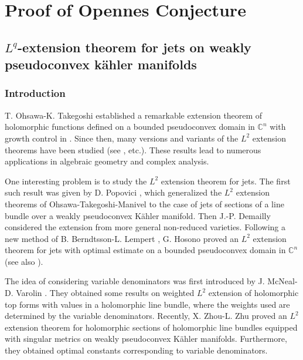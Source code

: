 \documentclass[lang=en,12pt,twoside]{textbook}
\begin{document}
\begin{titlepage}
    \tableofcontents
    \restoregeometry
\end{titlepage}


\part{Proof of Opennes Conjecture}


\chapter{\texorpdfstring{$L^q$}{L square}-extension theorem for jets on weakly pseudoconvex k\"ahler manifolds}

\section{Introduction}
T. Ohsawa-K. Takegoshi established a remarkable extension theorem of holomorphic functions defined on a bounded pseudoconvex domain in $\mathbb{C}^n$ with growth control in \cite{OhsawaTakegoshi1987}. Since then, many versions and variants of the $L^2$ extension theorems have been studied (see  \cite{BZ13,Manivel1993,MV06,Popovici2004L2EF,ZZ18}, etc.). These results lead to numerous applications in algebraic geometry and complex analysis.

One interesting problem is to study the $L^2$ extension theorem for jets. The first such result was given by D. Popovici \cite{Popovici2004L2EF}, which generalized the $L^2$ extension theorems of Ohsawa-Takegoshi-Manivel to the case of jets of sections of a line bundle over a weakly pseudoconvex Kähler manifold. Then J.-P. Demailly \cite{Demailly2015} considered the extension from more general non-reduced varieties. Following a new method of B. Berndtsson-L. Lempert \cite{BB14}, G. Hosono \cite{HG17} proved an $L^2$ extension theorem for jets with optimal estimate on a bounded pseudoconvex domain in $\mathbb{C}^n$ (see also \cite{MJV17}).

The idea of considering variable denominators was first introduced by J. McNeal-D. Varolin \cite{MV06}. They obtained some results on weighted $L^2$ extension of holomorphic top forms with values in a holomorphic line bundle, where the weights used are determined by the variable denominators. Recently, X. Zhou-L. Zhu \cite{ZZ18} proved an $L^2$ extension theorem for holomorphic sections of holomorphic line bundles equipped with singular metrics on weakly pseudoconvex Kähler manifolds. Furthermore, they obtained optimal constants corresponding to variable denominators.
\end{document}

